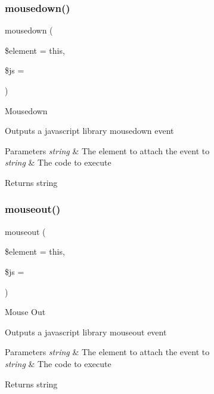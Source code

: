 \subsubsection{\texorpdfstring{mousedown()}{mousedown()}}
{\footnotesize\ttfamily mousedown (\begin{DoxyParamCaption}\item[{}]{\$element = {\ttfamily \textquotesingle{}this\textquotesingle{}},  }\item[{}]{\$js = {\ttfamily \textquotesingle{}\textquotesingle{}} }\end{DoxyParamCaption})}

Mousedown

Outputs a javascript library mousedown event


\begin{DoxyParams}{Parameters}
{\em string} & The element to attach the event to \\
\hline
{\em string} & The code to execute \\
\hline
\end{DoxyParams}
\begin{DoxyReturn}{Returns}
string 
\end{DoxyReturn}
\mbox{\label{class_c_i___javascript_ab2d069b9fbd0500e0f514e9ec5dc94e1}} 
\subsubsection{\texorpdfstring{mouseout()}{mouseout()}}
{\footnotesize\ttfamily mouseout (\begin{DoxyParamCaption}\item[{}]{\$element = {\ttfamily \textquotesingle{}this\textquotesingle{}},  }\item[{}]{\$js = {\ttfamily \textquotesingle{}\textquotesingle{}} }\end{DoxyParamCaption})}

Mouse Out

Outputs a javascript library mouseout event


\begin{DoxyParams}{Parameters}
{\em string} & The element to attach the event to \\
\hline
{\em string} & The code to execute \\
\hline
\end{DoxyParams}
\begin{DoxyReturn}{Returns}
string 
\end{DoxyReturn}
\mbox{\label{class_c_i___javascript_af54e0f954a0bb3983011578c848faf48}} 
